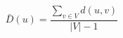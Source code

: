 \documentclass[12pt]{article}
\begin{document}
\[
\bar{D}\left(u\right) =
    \frac{\sum_{v \in V}{d\left(u,v\right)}}{\left|V\right|-1}
\]
\end{document}
